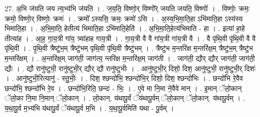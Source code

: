 \documentclass[17pt]{extarticle}
\begin{document}
27. अ॒भि ज॑यति जय त्य॒भ्य॑भि ज॑यति । . ज॒य॒ति॒ विष्णो॒र् विष्णो᳚र् जयति जयति॒ विष्णोः᳚ । . विष्णोः॒ क्रमः॒ क्रमो॒ विष्णो॒र् विष्णोः॒ क्रमः॑ । . क्रमो᳚ ऽस्यसि॒ क्रमः॒ क्रमो॑ ऽसि । . अ॒स्य॒भि॒मा॒ति॒हा ऽभि॑माति॒हा ऽस्य॑स्य भिमाति॒हा । . अ॒भि॒मा॒ति॒ हेतीत्य॑ भिमाति॒हा ऽभि॑माति॒हेति॑ । . अ॒भि॒मा॒ति॒हेत्य॑भिमाति - हा । . इत्या॑ हा॒हे तीत्या॑ह । . आ॒ह॒ गा॒य॒त्री गा॑य॒ त्र्या॑हाह गाय॒त्री । . गा॒य॒त्री वै वै गा॑य॒त्री गा॑य॒त्री वै । . वै पृ॑थि॒वी पृ॑थि॒वी वै वै पृ॑थि॒वी । . पृ॒थि॒वी त्रैष्टु॑भ॒म् त्रैष्टु॑भम् पृथि॒वी पृ॑थि॒वी त्रैष्टु॑भम् । . त्रैष्टु॑भ म॒न्तरि॑क्ष म॒न्तरि॑क्ष॒म् त्रैष्टु॑भ॒म् त्रैष्टु॑भ म॒न्तरि॑क्षम् । . अ॒न्तरि॑क्ष॒म् जाग॑ती॒ जाग॑त्य॒ न्तरि॑क्ष म॒न्तरि॑क्ष॒म् जाग॑ती । . जाग॑ती॒ द्यौर् द्यौर् जाग॑ती॒ जाग॑ती॒ द्यौः । . द्यौ रानु॑ष्टुभी॒ रानु॑ष्टुभी॒र् द्यौर् द्यौ रानु॑ष्टुभीः । . आनु॑ष्टुभी॒र् दिशो॒ दिश॒ आनु॑ष्टुभी॒ रानु॑ष्टुभी॒र् दिशः॑ । . आनु॑ष्टुभी॒रित्यानु॑ - स्तु॒भीः॒ । . दिश॒ श्छन्दो॑भि॒ श्छन्दो॑भि॒र् दिशो॒ दिश॒ श्छन्दो॑भिः । . छन्दो॑भि रे॒वैव छन्दो॑भि॒ श्छन्दो॑भि रे॒व । . छन्दो॑भि॒रिति॒ छन्दः॑ - भिः॒ । . ए॒वे मा नि॒मा ने॒वैवे मान् । . इ॒मान् ॅलो॒कान् ॅलो॒का नि॒मा नि॒मान् ॅलो॒कान् । . लो॒कान्. य॑थापू॒र्वं ॅय॑थापू॒र्वम् ॅलो॒कान् ॅलो॒कान्. य॑थापू॒र्वम् । . य॒था॒पू॒र्व म॒भ्य॑भि य॑थापू॒र्वं ॅय॑थापू॒र्व म॒भि । . य॒था॒पू॒र्वमिति॑ यथा - पू॒र्वम् । \newline
\end{document}
